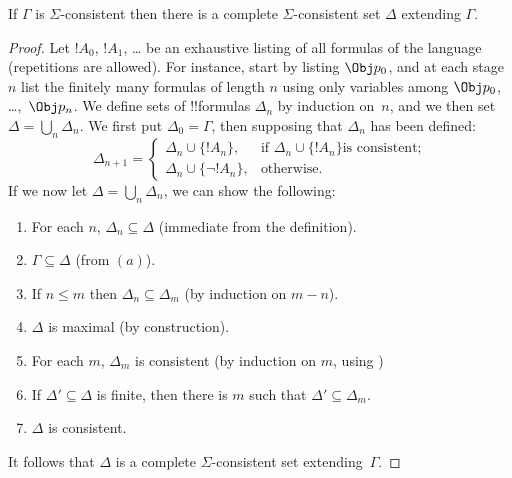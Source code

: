 \documentclass[../../../include/open-logic-section]{subfiles}
\begin{document}


\begin{thm}
  If $\Gamma$ is $\Sigma$-consistent then there is a complete
  $\Sigma$-consistent set $\Delta$ extending $\Gamma$.
\end{thm}

\begin{proof}
Let $!A_0$, $!A_1$, \dots{} be an exhaustive listing of all formulas
of the language (repetitions are allowed). For instance, start by
listing $\Obj p_0$, and at each stage $n$ list the finitely many
formulas of length $n$ using only variables among $\Obj p_0$,
\dots,~$\Obj p_n$. We define sets of !!{formula}s $\Delta_n$ by
induction on~$n$, and we then set $\Delta = \bigcup_n \Delta_n$. We
first put $\Delta_0 = \Gamma$, then supposing that $\Delta_n$ has been
defined:
\[
\Delta_{n+1} =
\begin{cases}
  \Delta_n \cup \{!A_n\}, & \text{if $\Delta_n \cup \{ !A_n\}$
    is consistent;} \\
  \Delta_n \cup \{ \lnot !A_n\}, & \text{otherwise.}
\end{cases}
\]
If we now let $\Delta = \bigcup_n \Delta_n$, we can show the
following:
\begin{enumerate}
\item For each $n$, $\Delta_n \subseteq \Delta$ (immediate from the
  definition).
\item $\Gamma \subseteq \Delta$ (from $(a)$).
\item If $n \le m$ then $\Delta_n \subseteq \Delta_m$ (by induction on
  $m-n$).
\item $\Delta$ is maximal (by construction).
\item For each $m$, $\Delta_m$ is consistent (by induction on $m$,
  using
  )
\item If $\Delta' \subseteq \Delta$ is finite, then there is $m$ such
  that $\Delta' \subseteq \Delta_m$.
\item $\Delta$ is consistent. 
\end{enumerate}
It follows that $\Delta$ is a complete $\Sigma$-consistent set
extending~$\Gamma$.
\end{proof}
\end{document}
